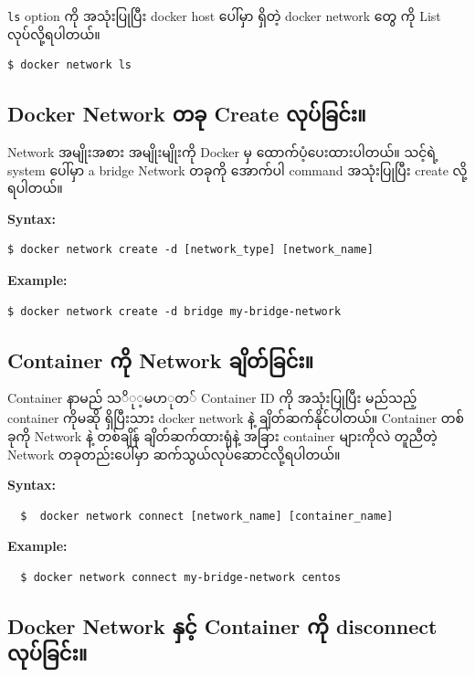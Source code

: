 \documentclass{article}
\begin{document}
\texttt{ls} option ကို အသုံးပြုပြီး docker host ပေါ်မှာ ရှိတဲ့ docker
network တွေ ကို List လုပ်လို့ရပါတယ်။

\begin{verbatim}
$ docker network ls
\end{verbatim}

\subsection{Docker Network တခု Create
လုပ်ခြင်း။}\label{docker-network--create-}

Network အမျိုးအစား အမျိုးမျိုးကို Docker မှ ထောက်ပံ့ပေးထားပါတယ်။ သင့်ရဲ့
system ပေါ်မှာ a bridge Network တခုကို အောက်ပါ command အသုံးပြုပြီး
create လို့ရပါတယ်။

\textbf{Syntax:}

\begin{verbatim}
$ docker network create -d [network_type] [network_name]
\end{verbatim}

\textbf{Example:}

\begin{verbatim}
$ docker network create -d bridge my-bridge-network
\end{verbatim}

\subsection{Container ကို Network
ချိတ်ခြင်း။}\label{container--network-}

Container နာမည် $သို့မဟုတ်$ Container ID ကို အသုံးပြုပြီး မည်သည့်
container ကိုမဆို ရှိပြီးသား docker network နဲ့ ချိတ်ဆက်နိုင်ပါတယ်။
Container တစ်ခုကို Network နဲ့ တစ်ချိန် ချိတ်ဆက်ထားရုံနဲ့ အခြား
container များကိုလဲ တူညီတဲ့ Network တခုတည်းပေါ်မှာ
ဆက်သွယ်လုပ်ဆောင်လို့ရပါတယ်။

\textbf{Syntax:}

\begin{verbatim}
  $  docker network connect [network_name] [container_name]
\end{verbatim}

\textbf{Example:}

\begin{verbatim}
  $ docker network connect my-bridge-network centos
\end{verbatim}

\subsection{Docker Network နှင့် Container ကို disconnect
လုပ်ခြင်း။}\label{docker-network--container--disconnect-}
\end{document}
